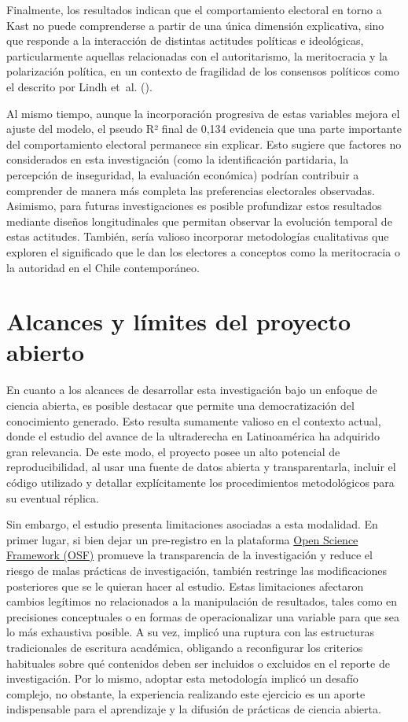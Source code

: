 \documentclass[
  spanish,
  a4paper,
  oneside]{scrbook}
\begin{document}
Finalmente, los resultados indican que el comportamiento electoral en
torno a Kast no puede comprenderse a partir de una única dimensión
explicativa, sino que responde a la interacción de distintas actitudes
políticas e ideológicas, particularmente aquellas relacionadas con el
autoritarismo, la meritocracia y la polarización política, en un
contexto de fragilidad de los consensos políticos como el descrito por
Lindh et~al. ().

Al mismo tiempo, aunque la incorporación progresiva de estas variables
mejora el ajuste del modelo, el pseudo R² final de 0,134 evidencia que
una parte importante del comportamiento electoral permanece sin
explicar. Esto sugiere que factores no considerados en esta
investigación (como la identificación partidaria, la percepción de
inseguridad, la evaluación económica) podrían contribuir a comprender de
manera más completa las preferencias electorales observadas. Asimismo,
para futuras investigaciones es posible profundizar estos resultados
mediante diseños longitudinales que permitan observar la evolución
temporal de estas actitudes. También, sería valioso incorporar
metodologías cualitativas que exploren el significado que le dan los
electores a conceptos como la meritocracia o la autoridad en el Chile
contemporáneo.

\section{Alcances y límites del proyecto
abierto}\label{alcances-y-luxedmites-del-proyecto-abierto}

En cuanto a los alcances de desarrollar esta investigación bajo un
enfoque de ciencia abierta, es posible destacar que permite una
democratización del conocimiento generado. Esto resulta sumamente
valioso en el contexto actual, donde el estudio del avance de la
ultraderecha en Latinoamérica ha adquirido gran relevancia. De este
modo, el proyecto posee un alto potencial de reproducibilidad, al usar
una fuente de datos abierta y transparentarla, incluir el código
utilizado y detallar explícitamente los procedimientos metodológicos
para su eventual réplica.

Sin embargo, el estudio presenta limitaciones asociadas a esta
modalidad. En primer lugar, si bien dejar un pre-registro en la
plataforma \href{https://osf.io/}{Open Science Framework (OSF)} promueve
la transparencia de la investigación y reduce el riesgo de malas
prácticas de investigación, también restringe las modificaciones
posteriores que se le quieran hacer al estudio. Estas limitaciones
afectaron cambios legítimos no relacionados a la manipulación de
resultados, tales como en precisiones conceptuales o en formas de
operacionalizar una variable para que sea lo más exhaustiva posible. A
su vez, implicó una ruptura con las estructuras tradicionales de
escritura académica, obligando a reconfigurar los criterios habituales
sobre qué contenidos deben ser incluidos o excluidos en el reporte de
investigación. Por lo mismo, adoptar esta metodología implicó un desafío
complejo, no obstante, la experiencia realizando este ejercicio es un
aporte indispensable para el aprendizaje y la difusión de prácticas de
ciencia abierta.
\end{document}
